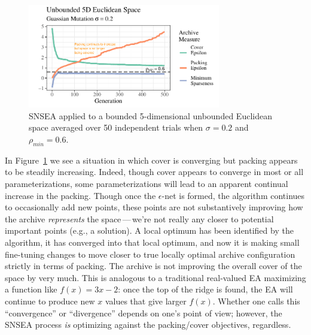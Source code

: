 \documentclass[twoside]{article}
\begin{document}
%
\begin{figure}[h]
  \center\includegraphics[width=0.75\textwidth]{Figures/unbounded-s02-r06-NOPOP.pdf}
  \caption{\label{fig:unbounded:nopop:0206} SNSEA applied to a bounded 5-dimensional unbounded Euclidean space averaged over 50 independent trials when $\sigma=0.2$ and $\rho_{min}=0.6$.}
\end{figure}
%
In Figure~\ref{fig:unbounded:nopop:0206} we see a situation in which cover is converging but packing appears to be steadily increasing.  Indeed, though cover appears to converge in most or all parameterizations, some parameterizations will lead to an apparent continual increase in the packing.  Though once the $\epsilon$-net is formed, the algorithm continues to occasionally add new points, these points are not substantively improving how the archive \emph{represents} the space\,---\,we're not really any closer to potential important points (e.g., a solution).  A local optimum has been identified by the algorithm, it has converged into that local optimum, and now it is making small fine-tuning changes to move closer to true locally optimal archive configuration strictly in terms of packing.  The archive is not improving the overall cover of the space by very much.  This is analogous to a traditional real-valued EA maximizing a function like $f(x)=3x - 2$: once the top of the ridge is found, the EA will continue to produce new $x$ values that give larger $f(x)$.  Whether one calls this ``convergence'' or ``divergence'' depends on one's point of view; however, the SNSEA process \emph{is} optimizing against the packing/cover objectives, regardless.
\end{document}
